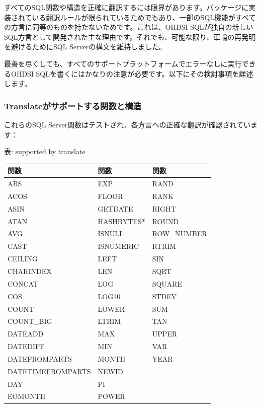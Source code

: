\documentclass[
  11pt]{book}
\makeatletter
\newenvironment{kframe}{%
\medskip{}
\setlength{\fboxsep}{.8em}
 \def\at@end@of@kframe{}%
 \ifinner\ifhmode%
  \def\at@end@of@kframe{\end{minipage}}%
  \begin{minipage}{\columnwidth}%
 \fi\fi%
 \def\FrameCommand##1{\hskip\@totalleftmargin \hskip-\fboxsep
 \colorbox{myShadeColor}{##1}\hskip-\fboxsep
     \hskip-\linewidth \hskip-\@totalleftmargin \hskip\columnwidth}%
 \MakeFramed {\advance\hsize-\width
   \@totalleftmargin\z@ \linewidth\hsize
   \@setminipage}}%
 {\par\unskip\endMakeFramed%
 \at@end@of@kframe}
\newenvironment{rmdblock}[1]
  {
  \begin{itemize}
  \renewcommand{\labelitemi}{
    \raisebox{-.7\height}[0pt][0pt]{
      {\setkeys{Gin}{width=3em,keepaspectratio}\texttt{[image: images/\#1]}}
    }
  }
  \setlength{\fboxsep}{1em}
  \begin{kframe}
  \item
  }
  {
  \end{kframe}
  \end{itemize}
  }
\newenvironment{rmdimportant}
  {\begin{rmdblock}{important}}
  {\end{rmdblock}}
\theoremstyle{definition}
\theoremstyle{definition}
\theoremstyle{definition}
\theoremstyle{definition}
\theoremstyle{remark}
\makeatother
\begin{document}
\begin{rmdimportant}
すべてのSQL関数や構造を正確に翻訳するには限界があります。パッケージに実装されている翻訳ルールが限られているためでもあり、一部のSQL機能がすべての方言に同等のものを持たないためです。これは、OHDSI SQLが独自の新しいSQL方言として開発された主な理由です。それでも、可能な限り、車輪の再発明を避けるためにSQL Serverの構文を維持しました。
\end{rmdimportant}

最善を尽くしても、すべてのサポートプラットフォームでエラーなしに実行できるOHDSI SQLを書くにはかなりの注意が必要です。以下にその検討事項を詳述します。

\subsubsection*{Translateがサポートする関数と構造}\label{translateux304cux30b5ux30ddux30fcux30c8ux3059ux308bux95a2ux6570ux3068ux69cbux9020}

これらのSQL Server関数はテストされ、各方言への正確な翻訳が確認されています：

表: \label{tab:sqlFunctions} supported by translate

\begin{longtable}[]{@{}lll@{}}
\toprule\noalign{}
関数 & 関数 & 関数 \\
\midrule\noalign{}
\endhead
\bottomrule\noalign{}
\endlastfoot
ABS & EXP & RAND \\
ACOS & FLOOR & RANK \\
ASIN & GETDATE & RIGHT \\
ATAN & HASHBYTES* & ROUND \\
AVG & ISNULL & ROW\_NUMBER \\
CAST & ISNUMERIC & RTRIM \\
CEILING & LEFT & SIN \\
CHARINDEX & LEN & SQRT \\
CONCAT & LOG & SQUARE \\
COS & LOG10 & STDEV \\
COUNT & LOWER & SUM \\
COUNT\_BIG & LTRIM & TAN \\
DATEADD & MAX & UPPER \\
DATEDIFF & MIN & VAR \\
DATEFROMPARTS & MONTH & YEAR \\
DATETIMEFROMPARTS & NEWID & \\
DAY & PI & \\
EOMONTH & POWER & \\
\end{longtable}
\end{document}
